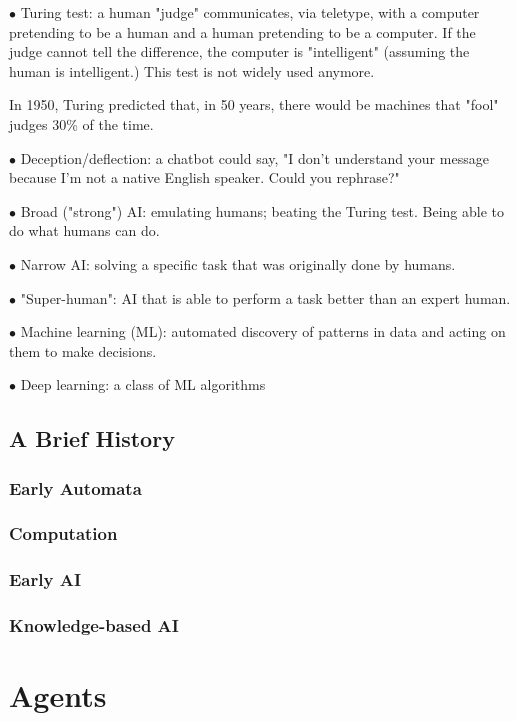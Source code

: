 \documentclass[english,openany]{book}
\begin{document}
    $\bullet$ Turing test: a human "judge" communicates, via teletype, with a computer pretending to be a human and a human pretending to be a computer. If the judge cannot tell the difference, the computer is "intelligent" (assuming the human is intelligent.) This test is not widely used anymore.

    In 1950, Turing predicted that, in 50 years, there would be machines that "fool" judges 30\% of the time.

    $\bullet$ Deception/deflection: a chatbot could say, "I don't understand your message because I'm not a native English speaker. Could you rephrase?"

    $\bullet$ Broad ("strong") AI: emulating humans; beating the Turing test. Being able to do what humans can do.

    $\bullet$ Narrow AI: solving a specific task that was originally done by humans.

    $\bullet$ "Super-human": AI that is able to perform a task better than an expert human.

    $\bullet$ Machine learning (ML): automated discovery of patterns in data and acting on them to make decisions.

    $\bullet$ Deep learning: a class of ML algorithms
    
    \section{A Brief History}
    
    
    \subsection{Early Automata}
    
    \subsection{Computation}
    
    \subsection{Early AI}
    
    \subsection{Knowledge-based AI}
    
    \chapter{Agents}
    
\end{document}
